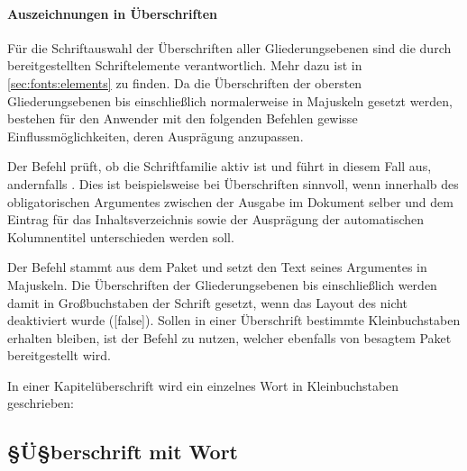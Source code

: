 \subsubsection{Auszeichnungen in Überschriften}
Für die Schriftauswahl der Überschriften aller Gliederungsebenen sind die durch 
\KOMAScript{} bereitgestellten Schriftelemente verantwortlich. Mehr dazu ist in 
\autoref{sec:fonts:elements} zu finden. Da die Überschriften der obersten 
Gliederungsebenen bis einschließlich  normalerweise in 
Majuskeln gesetzt werden, bestehen für den Anwender mit den folgenden Befehlen 
gewisse Einflussmöglichkeiten, deren Ausprägung anzupassen.

\begin{Declaration}{}%
\printdeclarationlist%
%
%
Der Befehl  prüft, ob die Schriftfamilie \DIN aktiv ist und führt 
in diesem Fall  aus, andernfalls . 
Dies ist beispielsweise bei Überschriften sinnvoll, wenn innerhalb des 
obligatorischen Argumentes zwischen der Ausgabe im Dokument selber und dem 
Eintrag für das Inhaltsverzeichnis sowie der Ausprägung der automatischen 
Kolumnentitel unterschieden werden soll.
\end{Declaration}

\begin{Declaration}{}%
\begin{Declaration}{}%
\printdeclarationlist%
%
%
Der Befehl  stammt aus dem Paket  
und setzt den Text seines Argumentes in Majuskeln. Die Überschriften der 
Gliederungsebenen bis einschließlich  werden damit in 
Großbuchstaben der Schrift \DIN gesetzt, wenn das Layout des \CDs nicht 
deaktiviert wurde ([false]). Sollen in einer Überschrift bestimmte 
Kleinbuchstaben erhalten bleiben, ist der Befehl  zu 
nutzen, welcher ebenfalls von besagtem Paket bereitgestellt wird.
\end{Declaration}
\end{Declaration}
%
\begin{Example}
In einer Kapitelüberschrift wird ein einzelnes Wort in Kleinbuchstaben 
geschrieben:
\begin{Code}[escapechar=§]
\chapter{§Ü§berschrift mit  Wort}
\end{Code}
\end{Example}

